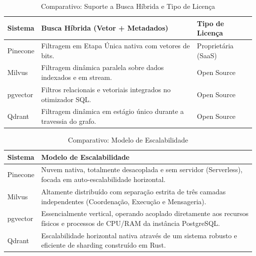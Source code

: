 \documentclass[a4paper, 12pt]{article}
\begin{document}
\begin{table}[H]
\centering
\caption{Comparativo: Suporte a Busca Híbrida e Tipo de Licença}
\begin{tabularx}{\textwidth}{l X l}
\toprule
\textbf{Sistema} & \textbf{Busca Híbrida (Vetor + Metadados)} & \textbf{Tipo de Licença} \\
\midrule
Pinecone & Filtragem em Etapa Única nativa com vetores de bits. & Proprietária (SaaS) \\
Milvus & Filtragem dinâmica paralela sobre dados indexados e em stream. & Open Source \\
pgvector & Filtros relacionais e vetoriais integrados no otimizador SQL. & Open Source \\
Qdrant & Filtragem dinâmica em estágio único durante a travessia do grafo. & Open Source \\
\bottomrule
\end{tabularx}
\end{table}

\begin{table}[H]
\centering
\caption{Comparativo: Modelo de Escalabilidade}
\begin{tabularx}{\textwidth}{l X}
\toprule
\textbf{Sistema} & \textbf{Modelo de Escalabilidade} \\
\midrule
Pinecone & Nuvem nativa, totalmente desacoplada e sem servidor (Serverless), focada em auto-escalabilidade horizontal. \\
Milvus & Altamente distribuído com separação estrita de três camadas independentes (Coordenação, Execução e Mensageria). \\
pgvector & Essencialmente vertical, operando acoplado diretamente aos recursos físicos e processos de CPU/RAM da instância PostgreSQL. \\
Qdrant & Escalabilidade horizontal nativa através de um sistema robusto e eficiente de sharding construído em Rust. \\
\bottomrule
\end{tabularx}
\end{table}
\end{document}
